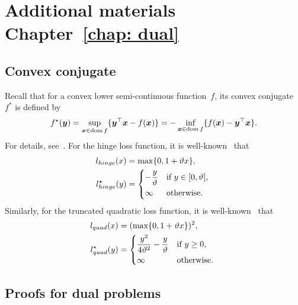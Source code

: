 \chapter{Additional materials Chapter~\ref{chap: dual}}

\section{Convex conjugate}

Recall that for a convex lower semi-continuous function~$f$, its convex conjugate~$f^*$ is defined by
\begin{equation*}
  f^{\star} (\bm{y})
  =  \sup_{\bm{x} \in \operatorname*{dom} f} \{\bm{y}^{\top}\bm{x} - f(\bm{x})\}
  = -\inf_{\bm{x} \in \operatorname*{dom} f} \{f(\bm{x}) - \bm{y}^{\top}\bm{x}\}.    
\end{equation*}
For details, see~\cite[page~91]{boyd2004convex}. For the hinge loss function, it is well-known~\cite{shnlev2014accelerated} that 
\begin{equation}\label{eq:Conjugate of hinge loss}
  \begin{aligned}
    l_{hinge}(x) & = \max\{0,1 + \vartheta x\}, \\
    l_{hinge}^{\star}(y) & =
      \begin{dcases*}
        -\frac{y}{\vartheta} & if~$y \in [0, \vartheta]$, \\
        \infty & otherwise.
      \end{dcases*}  
  \end{aligned}
\end{equation}
Similarly, for the truncated quadratic loss function, it is well-known~\cite{kanamori2013conjugate} that
\begin{equation}\label{eq:Conjugate of truncated quadratic loss}
  \begin{aligned}
    l_{quad}(x) &= (\max\{0,1 + \vartheta x\} )^2, \\
    l_{quad}^{\star}(y) & =
      \begin{dcases*}
        \frac{y^2}{4\vartheta^2} - \frac{y}{\vartheta} & if~$y \geq 0$, \\
        \infty & otherwise. \\
      \end{dcases*}  
  \end{aligned}
\end{equation}

\section{Proofs for dual problems}


